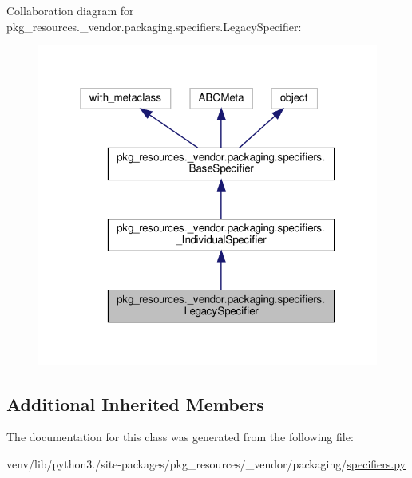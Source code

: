 Collaboration diagram for pkg\+\_\+resources.\+\_\+vendor.\+packaging.\+specifiers.\+Legacy\+Specifier\+:
\nopagebreak
\begin{figure}[H]
\begin{center}
\leavevmode
\includegraphics[width=319pt]{classpkg__resources_1_1__vendor_1_1packaging_1_1specifiers_1_1LegacySpecifier__coll__graph}
\end{center}
\end{figure}
\subsection*{Additional Inherited Members}


The documentation for this class was generated from the following file\+:\begin{DoxyCompactItemize}
\item 
venv/lib/python3./site-\/packages/pkg\+\_\+resources/\+\_\+vendor/packaging/\hyperlink{pkg__resources_2__vendor_2packaging_2specifiers_8py}{specifiers.\+py}\end{DoxyCompactItemize}
